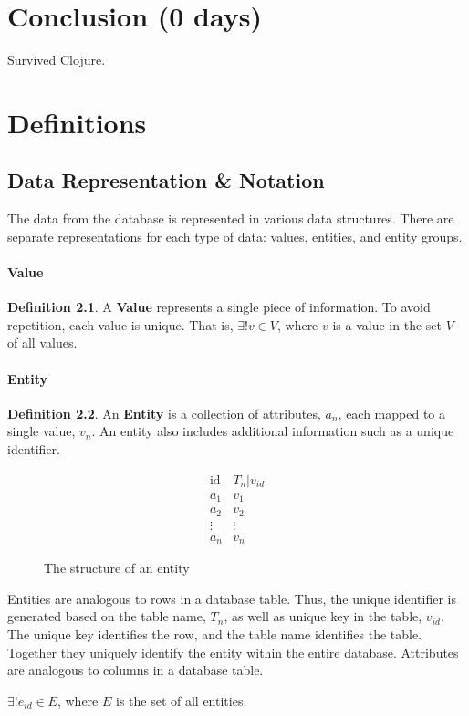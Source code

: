 \documentclass[12pt,letterpaper,oneside,notitlepage]{report}
\theoremstyle{definition}
\newtheorem{defn}{Definition}
\begin{document}
      \chapter{Conclusion (0 days)}
        Survived Clojure.

  
  \chapter{Definitions}
    \section{Data Representation \& Notation}
    \label{sec:data-representation-notation}
      The data from the database is represented in various data structures.  There are separate representations for each type of data:  values, entities, and entity groups.

        \subsubsection{Value}
          \begin{defn}
            A \textbf{Value} represents a single piece of information.  To avoid repetition, each value is unique.  That is, $\exists! v \in V$, where $v$ is a value in the set $V$ of all values.
          \end{defn}

        \subsubsection{Entity}
          \begin{defn}
            An \textbf{Entity} is a collection of attributes, $a_n$, each mapped to a single value, $v_n$.  An entity also includes additional information such as a unique identifier.

            \begin{figure}[!ht]
              \centering
              \[
                \begin{array}{ll}
                  \mathrm{id} & T_n|v_{id} \\
                  a_1 & v_1 \\
                  a_2 & v_2 \\
                  \vdots & \vdots \\
                  a_n & v_n
                \end{array}
              \]
              \caption{The structure of an entity}
              \label{fig:entity-rep}
            \end{figure}

            Entities are analogous to rows in a database table.  Thus, the unique identifier is generated based on the table name, $T_n$, as well as unique key in the table, $v_{id}$.  The unique key identifies the row, and the table name identifies the table.  Together they uniquely identify the entity within the entire database.  Attributes are analogous to columns in a database table.

            $\exists! e_{id} \in E$, where $E$ is the set of all entities.
          \end{defn}
\end{document}
